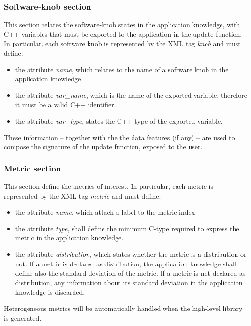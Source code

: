 \subsubsection*{Software-knob section}

This section relates the software-knob states in the application knowledge, with C++ variables that must be exported to the application in the update function.
In particular, each software knob is represented by the XML tag \textit{knob} and must define:
\begin{itemize}
	\item the attribute \textit{name}, which relates to the name of a software knob in the application knowledge
	\item the attribute \textit{var\_name}, which is the name of the exported variable, therefore it must be a valid C++ identifier.
	\item the attribute \textit{var\_type}, states the C++ type of the exported variable.
\end{itemize}

These information -- together with the the data features (if any) --  are used to compose the signature of the update function, exposed to the user.

\subsubsection*{Metric section}

This section define the metrics of interest.
In particular, each metric is represented by the XML tag \textit{metric} and must define:
\begin{itemize}
	\item the attribute \textit{name}, which attach a label to the metric index
	\item the attribute \textit{type}, shall define the minimum C-type required to express the metric in the application knowledge.
	\item the attribute \textit{distribution}, which states whether the metric is a distribution or not. If a metric is declared as distribution, the application knowledge shall define also the standard deviation of the metric. If a metric is not declared as distribution, any information about its standard deviation in the application knowledge is discarded.
\end{itemize}

Heterogeneous metrics will be automatically handled when the high-level library is generated. 



